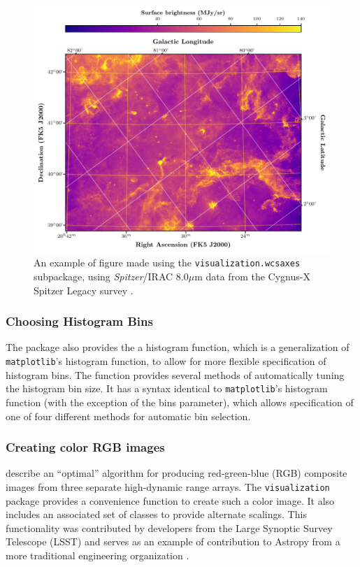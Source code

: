 \documentclass[modern]{aastex61}
\newcommand{\package}[1]{\texttt{#1}\xspace}
\begin{document}
\begin{figure}
\includegraphics[width=\textwidth]{cygnus_x_spitzer.pdf}
\caption{%
An example of figure made using the \package{visualization.wcsaxes} subpackage, using \textit{Spitzer}/IRAC 8.0$\mu$m data from the Cygnus-X Spitzer Legacy survey \citep{cygnusx}.
\label{fig:wcsaxes}
}
\end{figure}

\subsubsection{Choosing Histogram Bins}

The package also provides the a histogram function, which is a generalization
of \package{matplotlib}’s histogram function, to allow for more flexible
specification of histogram bins.  The function provides several methods of
automatically tuning the histogram bin size. It has a syntax identical to
\package{matplotlib}’s histogram function (with the exception of the bins
parameter), which allows specification of one of four different methods for
automatic bin selection.

\subsubsection{Creating color RGB images}

\cite{Lupton2004} describe an ``optimal'' algorithm for producing red-green-blue (RGB) composite images from three separate high-dynamic range arrays. The \package{visualization} package provides a convenience function to create such a color image.  It also includes an associated set of classes to provide alternate scalings.
This functionality was contributed by developers from the Large Synoptic Survey Telescope (LSST) and serves as an example of contribution to Astropy from a more traditional engineering organization \citep{lsst_astropy}.
\end{document}
